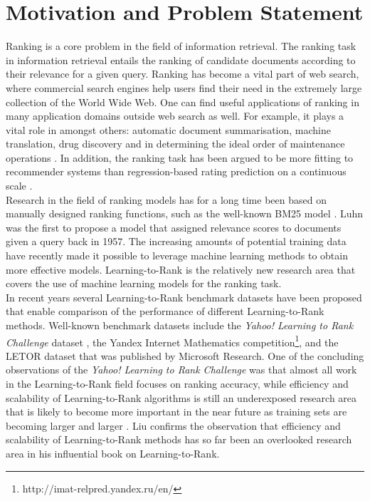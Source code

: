 \section{Motivation and Problem Statement}
Ranking is a core problem in the field of information retrieval. The ranking task in information retrieval entails the ranking of candidate documents according to their relevance for a given query. Ranking has become a vital part of web search, where commercial search engines help users find their need in the extremely large collection of the World Wide Web. One can find useful applications of ranking in many application domains outside web search as well. For example, it plays a vital role in amongst others: automatic document summarisation, machine translation, drug discovery and in determining the ideal order of maintenance operations \cite{Rudin2009}. In addition, the ranking task has been argued to be more fitting to recommender systems than regression-based rating prediction on a continuous scale \cite{Adomavicius2005,McNee2006}.\\

Research in the field of ranking models has for a long time been based on manually designed ranking functions, such as the well-known BM25 model \cite{Robertson1994}. Luhn \cite{Luhn1957} was the first to propose a model that assigned relevance scores to documents given a query back in 1957. The increasing amounts of potential training data have recently made it possible to leverage machine learning methods to obtain more effective models. Learning-to-Rank is the relatively new research area that covers the use of machine learning models for the ranking task.\\

In recent years several Learning-to-Rank benchmark datasets have been proposed that enable comparison of the performance of different Learning-to-Rank methods. Well-known benchmark datasets include the \emph{Yahoo! Learning to Rank Challenge} dataset \cite{Chapelle2011a}, the Yandex Internet Mathematics competition\footnote{http://imat-relpred.yandex.ru/en/}, and the LETOR dataset \cite{Qin2010} that was published by Microsoft Research. One of the concluding observations of the \emph{Yahoo! Learning to Rank Challenge} was that almost all work in the Learning-to-Rank field focuses on ranking accuracy, while efficiency and scalability of Learning-to-Rank algorithms is still an underexposed research area that is likely to become more important in the near future as training sets are becoming larger and larger \cite{Chapelle2011b}. Liu \cite{Liu2007} confirms the observation that efficiency and scalability of Learning-to-Rank methods has so far been an overlooked research area in his influential book on Learning-to-Rank.\\

